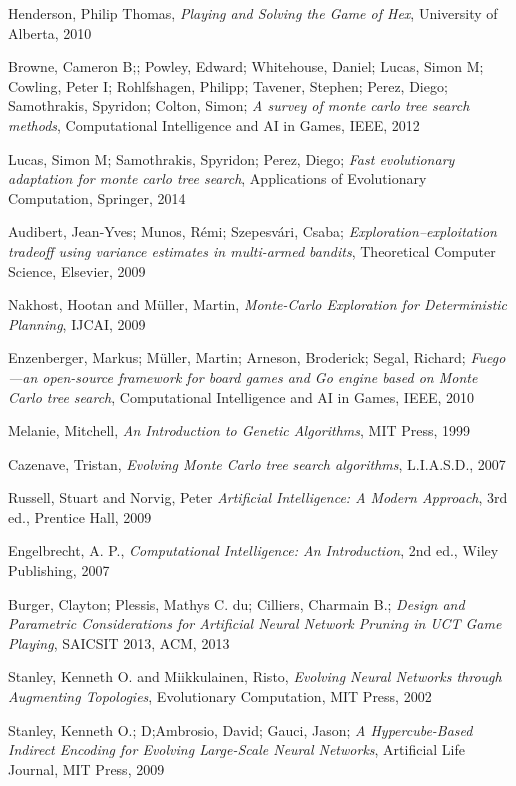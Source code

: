 \begin{thebibliography}{99}
 Henderson, Philip Thomas, \emph{Playing and Solving the Game of Hex}, University of Alberta, 2010

 Browne, Cameron B;; Powley, Edward; Whitehouse, Daniel; Lucas, Simon M; Cowling, Peter I; Rohlfshagen, Philipp; Tavener, Stephen; Perez, Diego; Samothrakis, Spyridon; Colton, Simon; \emph{A survey of monte carlo tree search methods}, Computational Intelligence and AI in Games, IEEE, 2012

 Lucas, Simon M; Samothrakis, Spyridon; Perez, Diego; \emph{Fast evolutionary adaptation for monte carlo tree search}, Applications of Evolutionary Computation, Springer, 2014

 Audibert, Jean-Yves; Munos, R{\'e}mi; Szepesv{\'a}ri, Csaba; \emph{Exploration--exploitation tradeoff using variance estimates in multi-armed bandits}, Theoretical Computer Science, Elsevier, 2009

 Nakhost, Hootan and M{\"u}ller, Martin, \emph{Monte-Carlo Exploration for Deterministic Planning}, IJCAI, 2009

 Enzenberger, Markus; M{\"u}ller, Martin; Arneson, Broderick; Segal, Richard; \emph{Fuego—an open-source framework for board games and Go engine based on Monte Carlo tree search}, Computational Intelligence and AI in Games, IEEE, 2010

 Melanie, Mitchell, \emph{An Introduction to Genetic Algorithms},  MIT Press, 1999

 Cazenave, Tristan, \emph{Evolving Monte Carlo tree search algorithms}, L.I.A.S.D., 2007

 Russell, Stuart and Norvig, Peter \emph{Artificial Intelligence: A Modern Approach}, 3rd ed., Prentice Hall, 2009

 Engelbrecht, A. P., \emph{Computational Intelligence: An Introduction}, 2nd ed., Wiley Publishing, 2007

 Burger, Clayton; Plessis, Mathys C. du; Cilliers, Charmain B.; \emph{Design and Parametric Considerations for Artiﬁcial Neural Network Pruning in UCT Game Playing}, SAICSIT 2013, ACM, 2013

 Stanley, Kenneth O. and Miikkulainen, Risto, \emph{Evolving Neural Networks through Augmenting Topologies}, Evolutionary Computation, MIT Press, 2002

 Stanley, Kenneth O.; D;Ambrosio, David; Gauci, Jason; \emph{A Hypercube-Based Indirect Encoding for Evolving Large-Scale Neural Networks}, Artificial Life Journal, MIT Press, 2009


\end{thebibliography}
